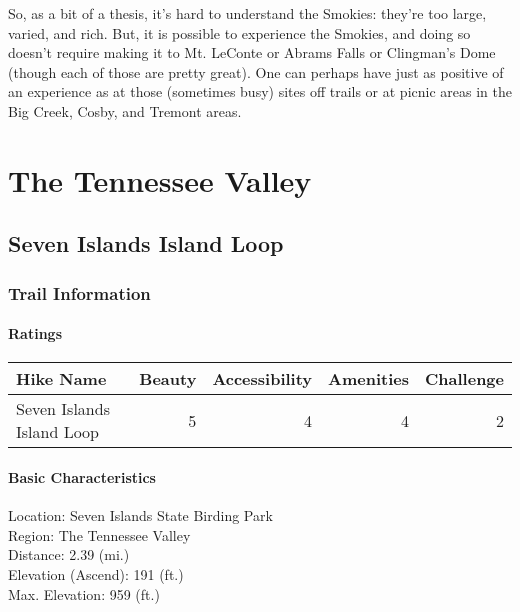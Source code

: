 \documentclass[
]{book}
\begin{document}
So, as a bit of a thesis, it's hard to understand the Smokies: they're too large, varied, and rich. But, it is possible to experience the Smokies, and doing so doesn't require making it to Mt. LeConte or Abrams Falls or Clingman's Dome (though each of those are pretty great). One can perhaps have just as positive of an experience as at those (sometimes busy) sites off trails or at picnic areas in the Big Creek, Cosby, and Tremont areas.

\hypertarget{part-the-tennessee-valley}{%
\part{The Tennessee Valley}\label{part-the-tennessee-valley}}

\hypertarget{seven-islands-island-loop}{%
\chapter{Seven Islands Island Loop}\label{seven-islands-island-loop}}

\hypertarget{trail-information}{%
\section{Trail Information}\label{trail-information}}

\hypertarget{ratings}{%
\subsection{Ratings}\label{ratings}}

\begin{tabular}{l|r|r|r|r}
\hline
Hike Name & Beauty & Accessibility & Amenities & Challenge\\
\hline
Seven Islands Island Loop & 5 & 4 & 4 & 2\\
\hline
\end{tabular}

\hypertarget{basic-characteristics}{%
\subsection{Basic Characteristics}\label{basic-characteristics}}

Location: Seven Islands State Birding Park\\
Region: The Tennessee Valley\\
Distance: 2.39 (mi.)\\
Elevation (Ascend): 191 (ft.)\\
Max. Elevation: 959 (ft.)
\end{document}
